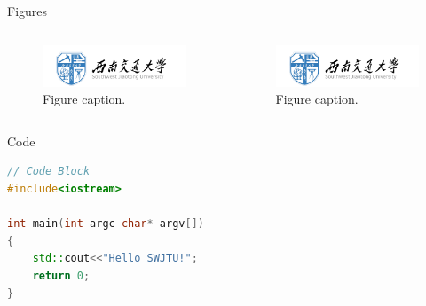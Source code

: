 \documentclass{beamer}
\begin{document}
\begin{frame}{Figures}
    \begin{columns}
            \begin{figure}
                \centering
                \includegraphics[scale = 0.08]{src/logo_name_blue.png}
                \caption{Figure caption.}
                \label{fig:dual fig demo 1}
            \end{figure}
            
        \begin{figure}
            \centering
            \includegraphics[scale = 0.08]{src/logo_name_blue.png}
            \caption{Figure caption.}
            \label{fig:dual fig demo 2}
        \end{figure}
\end{columns}
\end{frame}

\begin{frame}[fragile]{Code}
\begin{lstlisting}[language=C++]
// Code Block
#include<iostream>

int main(int argc char* argv[])
{
    std::cout<<"Hello SWJTU!";
    return 0;
}
\end{lstlisting}
\end{frame}
\end{document}
